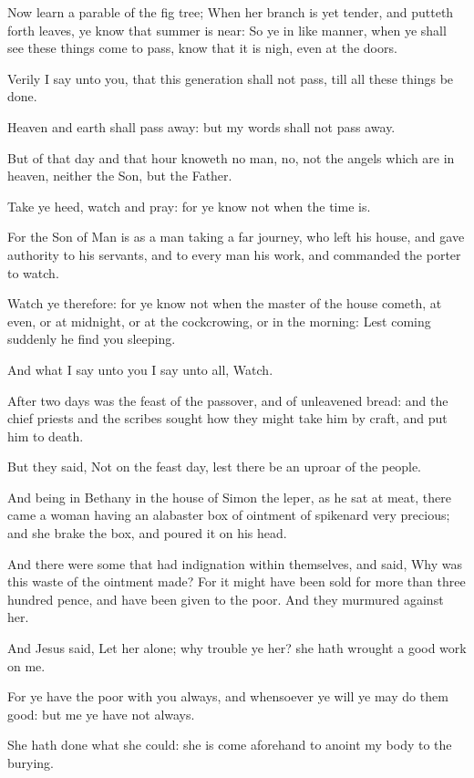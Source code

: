 \Verse Now learn a parable of the fig tree; When her branch is yet tender, and putteth forth leaves, ye know that summer is near: \Verse So ye in like manner, when ye shall see these things come to pass, know that it is nigh, even at the doors.

\Verse Verily I say unto you, that this generation shall not pass, till all these things be done.

\Verse Heaven and earth shall pass away: but my words shall not pass away.

\Verse But of that day and that hour knoweth no man, no, not the angels which are in heaven, neither the Son, but the Father.

\Verse Take ye heed, watch and pray: for ye know not when the time is.

\Verse For the Son of Man is as a man taking a far journey, who left his house, and gave authority to his servants, and to every man his work, and commanded the porter to watch.

\Verse Watch ye therefore: for ye know not when the master of the house cometh, at even, or at midnight, or at the cockcrowing, or in the morning: \Verse Lest coming suddenly he find you sleeping.

\Verse And what I say unto you I say unto all, Watch.


\Chapter
\Verse After two days was the feast of the passover, and of unleavened bread: and the chief priests and the scribes sought how they might take him by craft, and put him to death.

\Verse But they said, Not on the feast day, lest there be an uproar of the people.

\Verse And being in Bethany in the house of Simon the leper, as he sat at meat, there came a woman having an alabaster box of ointment of spikenard very precious; and she brake the box, and poured it on his head.

\Verse And there were some that had indignation within themselves, and said, Why was this waste of the ointment made?  \Verse For it might have been sold for more than three hundred pence, and have been given to the poor. And they murmured against her.

\Verse And Jesus said, Let her alone; why trouble ye her? she hath wrought a good work on me.

\Verse For ye have the poor with you always, and whensoever ye will ye may do them good: but me ye have not always.

\Verse She hath done what she could: she is come aforehand to anoint my body to the burying.

